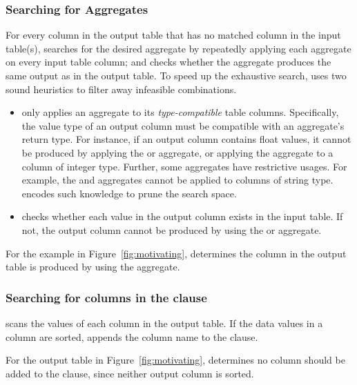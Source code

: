 
\subsubsection{Searching for Aggregates}
\label{sec:agg_search}

For every column in the output table that has no matched
column in the input table(s),
\ourtool searches for the desired aggregate by
repeatedly applying each aggregate on
every input table column; and checks whether
the aggregate produces the same output 
as in the output table. To speed up the exhaustive search,
\ourtool uses two sound heuristics to filter away infeasible
combinations.


\begin{itemize}
\item \ourtool only applies an aggregate
to its \textit{type-compatible} table columns. Specifically,
the value type of an output column must be compatible with an
aggregate's return type. For instance, if an output column
contains float values, it cannot be produced by applying the 
or  aggregate, or 
applying the  aggregate to a column of integer type.
Further, some aggregates have restrictive usages.
For example, the 
and  aggregates cannot be applied to columns of string type.
\ourtool encodes such knowledge to prune the search space.

\item \ourtool checks whether each value in the output
column exists in the input table. If not, the
output column cannot be produced by using
the  or  aggregate.
\end{itemize}

For the example in Figure~\ref{fig:motivating}, \ourtool
determines the  column in the output
table is produced by using the  aggregate.



\subsubsection{Searching for columns in the  clause}
\label{sec:orderby}
\ourtool scans the values of each column in the output table. If
the data values in a column are sorted, \ourtool
appends the column name to the  clause.

For the output table in Figure~\ref{fig:motivating}, \ourtool
determines no column should be added to the  clause,
since neither output column is sorted.

